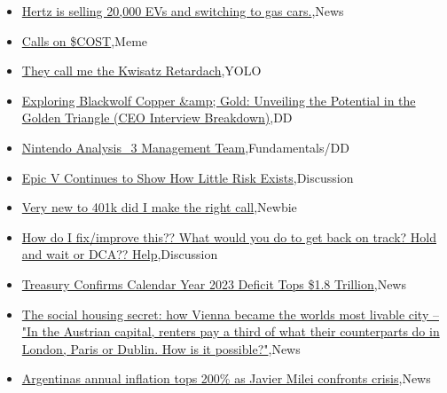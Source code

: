 \documentclass{article}%
\begin{document}
%
\begin{itemize}%
\item%
\href{https://reddit.com/r/wallstreetbets/comments/194tga2/hertz\_is\_selling\_20000\_evs\_and\_switching\_to\_gas/}{Hertz is selling 20,000 EVs and switching to gas cars.},News%
\item%
\href{https://reddit.com/r/wallstreetbets/comments/194ppi7/calls\_on\_cost/}{Calls on \$COST},Meme%
\item%
\href{https://reddit.com/r/wallstreetbets/comments/194o5fo/they\_call\_me\_the\_kwisatz\_retardach/}{They call me the Kwisatz Retardach},YOLO%
\item%
\href{https://reddit.com/r/Baystreetbets/comments/194hx6r/exploring\_blackwolf\_copper\_gold\_unveiling\_the/}{Exploring Blackwolf Copper \&amp; Gold: Unveiling the Potential in the Golden Triangle (CEO Interview Breakdown)},DD%
\item%
\href{https://reddit.com/r/StockMarket/comments/194o9am/nintendo\_analysis\_3\_management\_team/}{Nintendo Analysis\_3 Management Team},Fundamentals/DD%
\item%
\href{https://reddit.com/r/StockMarket/comments/194g8rr/epic\_v\_continues\_to\_show\_how\_little\_risk\_exists/}{Epic V Continues to Show How Little Risk Exists},Discussion%
\item%
\href{https://reddit.com/r/StockMarket/comments/194a8nx/very\_new\_to\_401k\_did\_i\_make\_the\_right\_call/}{Very new to 401k did I make the right call},Newbie%
\item%
\href{https://reddit.com/r/StockMarket/comments/1948rzr/how\_do\_i\_fiximprove\_this\_what\_would\_you\_do\_to\_get/}{How do I fix/improve this?? What would you do to get back on track? Hold and wait or DCA?? Help},Discussion%
\item%
\href{https://reddit.com/r/Economics/comments/194lsuu/treasury\_confirms\_calendar\_year\_2023\_deficit\_tops/}{Treasury Confirms Calendar Year 2023 Deficit Tops \$1.8 Trillion},News%
\item%
\href{https://reddit.com/r/Economics/comments/194ifw8/the\_social\_housing\_secret\_how\_vienna\_became\_the/}{The social housing secret: how Vienna became the worlds most livable city -- "In the Austrian capital, renters pay a third of what their counterparts do in London, Paris or Dublin. How is it possible?"},News%
\item%
\href{https://reddit.com/r/Economics/comments/194d9tj/argentinas\_annual\_inflation\_tops\_200\_as\_javier/}{Argentinas annual inflation tops 200\% as Javier Milei confronts crisis},News%
\end{itemize}%
\end{document}
